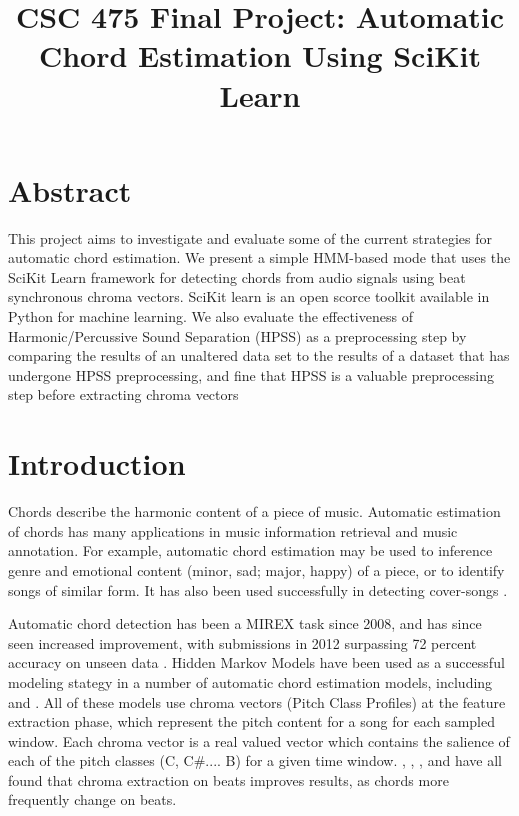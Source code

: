 \documentclass{article}
\title{CSC 475 Final Project: Automatic Chord Estimation Using SciKit Learn}
\begin{document}
%
\maketitle
%


\section{Abstract}\label{sec:desoutline}
This project aims to investigate and evaluate some of the current strategies
for automatic chord estimation. We present a simple HMM-based mode that uses
the SciKit Learn framework for detecting chords from audio signals using beat 
synchronous chroma vectors.  SciKit learn is an open scorce toolkit available
in Python for machine learning. We also evaluate the effectiveness of 
Harmonic/Percussive Sound Separation (HPSS) as a preprocessing step by comparing
the results of an unaltered data set to the results of a dataset that has undergone HPSS
preprocessing, and fine that HPSS is a valuable preprocessing step before extracting
chroma vectors

\section{Introduction}\label{sec:intro}

Chords describe the harmonic content of a piece of music. Automatic estimation of chords
has many applications in music information retrieval and music annotation. For example,
automatic chord estimation may be used to inference genre and emotional content 
(minor, sad; major, happy) of a piece, or to identify songs of similar form.
It has also been used successfully in detecting cover-songs \cite{Papadopoulos:18}.

Automatic chord detection has been a MIREX task since 2008, and has since seen increased
improvement, with submissions in 2012 surpassing 72 percent accuracy on unseen data
\cite{McVicar:00}. Hidden Markov Models have been used as a successful modeling stategy
 in a number of automatic chord estimation models, including \cite{Ueda:01} \cite{Lee:15} \cite{Ueda:19}
and \cite{Papadopoulos:18}. All of these models use chroma vectors (Pitch Class Profiles)
at the feature extraction phase, which represent the pitch content for a song for each sampled
window. Each chroma vector is a real valued vector which contains the salience of each of the 
pitch classes (C, C\#.... B) for a given time window. \cite{McVicar:00},  \cite{Lee:15}, \cite{Papadopoulos:18}, and\cite{Zenz:20} have all found that chroma extraction on beats improves results, as chords more frequently change on beats.
\end{document}
